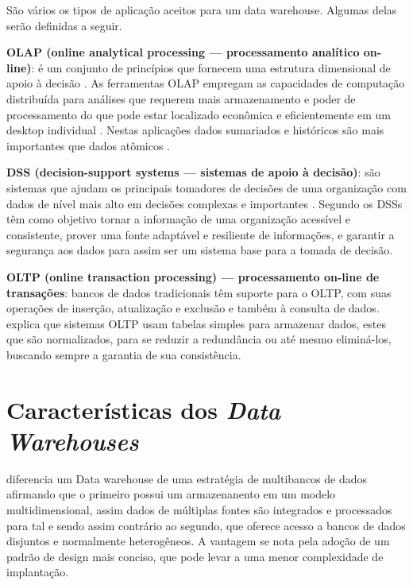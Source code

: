 São vários os tipos de aplicação aceitos para um data warehouse. Algumas delas serão definidas a seguir.


\textbf{OLAP (online analytical processing — processamento analítico on-line)}:
é um conjunto de princípios que fornecem uma estrutura dimensional de apoio à decisão \cite{Kimball2002}. As ferramentas OLAP empregam as capacidades de computação distribuída para análises que requerem mais armazenamento e poder de processamento do que pode estar localizado econômica e eficientemente em um desktop individual \cite{elmasri_sistemas_2011}. Nestas aplicações dados sumariados e históricos são mais importantes que dados atômicos \cite{hilmer2002}.

\textbf{DSS (decision-support systems — sistemas de apoio à decisão)}:
são sistemas que ajudam os principais tomadores de decisões de uma organização com dados de nível mais alto em decisões complexas e importantes \cite{elmasri_sistemas_2011}. Segundo   os DSSs têm como objetivo tornar a informação de uma organização acessível e consistente, prover uma fonte adaptável e resiliente de informações, e garantir a segurança aos dados para assim ser um sistema base para a tomada de decisão.

\textbf{OLTP (online transaction processing) — processamento on-line de transações}:
bancos de dados tradicionais têm suporte para o OLTP, com suas operações de inserção, atualização e exclusão e também à consulta de dados.  explica que sistemas OLTP usam tabelas simples para armazenar dados, estes que são normalizados, para se reduzir a redundância ou até mesmo eliminá-los, buscando sempre a garantia de sua consistência.

\section{Características dos \textit{Data Warehouses}}\label{sec:caract-dw}


 diferencia um Data warehouse de uma estratégia de multibancos de dados afirmando que o primeiro possui um armazenanento em um modelo multidimensional, assim dados de múltiplas fontes são integrados e processados para tal e sendo assim contrário ao segundo, que oferece acesso a bancos de dados disjuntos e normalmente heterogêneos. A vantagem se nota pela adoção de um padrão de design mais conciso, que pode levar a uma menor complexidade de implantação.


